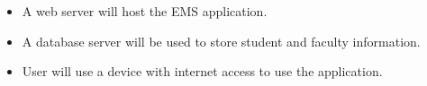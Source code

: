 \begin{itemize}
  \item A web server will host the EMS application. 
  \item A database server will be used to store student and faculty information.
  \item User will use a device with internet access to use the application.
\end{itemize}  
  
